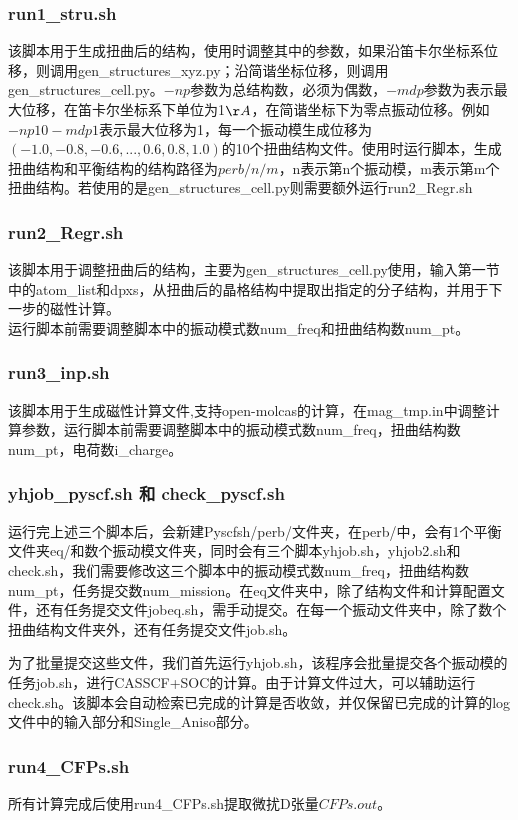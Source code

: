 \documentclass[UTF8]{ctexart}
\begin{document}
\subsubsection{run1\_stru.sh}
该脚本用于生成扭曲后的结构，使用时调整其中的参数，如果沿笛卡尔坐标系位移，则调用gen\_structures\_xyz.py；沿简谐坐标位移，则调用gen\_structures\_cell.py。$-np$参数为总结构数，必须为偶数，$-mdp$参数为表示最大位移，在笛卡尔坐标系下单位为1$\AA$，在简谐坐标下为零点振动位移。例如$-np 10 -mdp1$表示最大位移为1，每一个振动模生成位移为$(-1.0, -0.8, -0.6, ..., 0.6, 0.8, 1.0)$的10个扭曲结构文件。使用时运行脚本，生成扭曲结构和平衡结构的结构路径为$perb/n/m$，n表示第n个振动模，m表示第m个扭曲结构。若使用的是gen\_structures\_cell.py则需要额外运行run2\_Regr.sh
\subsubsection{run2\_Regr.sh}
该脚本用于调整扭曲后的结构，主要为gen\_structures\_cell.py使用，输入第一节中的atom\_list和dpxs，从扭曲后的晶格结构中提取出指定的分子结构，并用于下一步的磁性计算。\\
运行脚本前需要调整脚本中的振动模式数num\_freq和扭曲结构数num\_pt。
\subsubsection{run3\_inp.sh}
该脚本用于生成磁性计算文件,支持open-molcas的计算，在mag\_tmp.in中调整计算参数，运行脚本前需要调整脚本中的振动模式数num\_freq，扭曲结构数num\_pt，电荷数i\_charge。

\subsubsection{yhjob\_pyscf.sh 和 check\_pyscf.sh}
运行完上述三个脚本后，会新建Pyscfsh/perb/文件夹，在perb/中，会有1个平衡文件夹eq/和数个振动模文件夹，同时会有三个脚本yhjob.sh，yhjob2.sh和check.sh，我们需要修改这三个脚本中的振动模式数num\_freq，扭曲结构数num\_pt，任务提交数num\_mission。在eq文件夹中，除了结构文件和计算配置文件，还有任务提交文件jobeq.sh，需手动提交。在每一个振动文件夹中，除了数个扭曲结构文件夹外，还有任务提交文件job.sh。

为了批量提交这些文件，我们首先运行yhjob.sh，该程序会批量提交各个振动模的任务job.sh，进行CASSCF+SOC的计算。由于计算文件过大，可以辅助运行check.sh。该脚本会自动检索已完成的计算是否收敛，并仅保留已完成的计算的log文件中的输入部分和Single\_Aniso部分。

\subsubsection{run4\_CFPs.sh}
所有计算完成后使用run4\_CFPs.sh提取微扰D张量$CFPs.out$。
\end{document}
